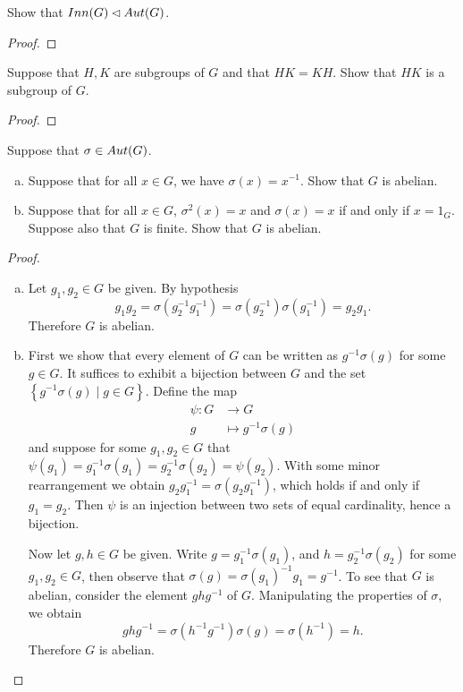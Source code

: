 \documentclass[10pt]{amsart}
\begin{document}
\begin{thm}
  Show that $\mathop{Inn}(G) \lhd \mathop{Aut}(G)$.
  \begin{proof}
    
  \end{proof}
\end{thm}

\begin{thm}
  Suppose that $H,K$ are subgroups of $G$ and that $HK = KH$.  Show that $HK$ is a subgroup of $G$.
  \begin{proof}
    
  \end{proof}
\end{thm}

\begin{thm}
  Suppose that $\sigma \in \mathop{Aut}(G)$.
  \begin{enumerate}[(a)]
  \item
    Suppose that for all $x \in G$, we have $\sigma(x) = x^{-1}.$  Show that $G$ is abelian.
  \item
    Suppose that for all $x \in G$, $\sigma^2(x) = x$ and $\sigma(x) = x$ if and only if $x = 1_G$.
    Suppose also that $G$ is finite.
    Show that $G$ is abelian.
  \end{enumerate}
  \begin{proof}
    \begin{enumerate}[(a)]
    \item
      Let $g_1,g_2 \in G$ be given.
      By hypothesis $$g_1g_2 = \sigma(g_2^{-1}g_1^{-1}) = \sigma(g_2^{-1})\sigma(g_1^{-1}) = g_2g_1.$$
      Therefore $G$ is abelian.
    \item
      First we show that every element of $G$ can be written as $g^{-1}\sigma(g)$ for some $g \in G$.
      It suffices to exhibit a bijection between $G$ and the set $\left\{g^{-1}\sigma(g) \mid g \in G\right\}$.
      Define the map
      \begin{align*}
        \psi \colon G & \rightarrow G\\
        g & \mapsto g^{-1}\sigma(g)
      \end{align*}
      and suppose for some $g_1, g_2 \in G$ that $\psi(g_1) = g_1^{-1}\sigma(g_1) = g_2^{-1}\sigma(g_2) = \psi(g_2)$.
      With some minor rearrangement we obtain $g_2g_1^{-1} = \sigma(g_2g_1^{-1})$, which holds if and only if $g_1 = g_2$.
      Then $\psi$ is an injection between two sets of equal cardinality, hence a bijection.
      
      Now let $g,h \in G$ be given.
      Write $g = g_1^{-1}\sigma(g_1)$, and $h = g_2^{-1}\sigma(g_2)$ for some $g_1,g_2 \in G$, then observe that $\sigma(g) = \sigma(g_1)^{-1}g_1 = g^{-1}$.
      To see that $G$ is abelian, consider the element $ghg^{-1}$ of $G$.
      Manipulating the properties of $\sigma$, we obtain
      $$ghg^{-1} = \sigma(h^{-1}g^{-1})\sigma(g) = \sigma(h^{-1}) = h.$$
      Therefore $G$ is abelian.
      
    \end{enumerate}
  \end{proof}
\end{thm}
\end{document}
